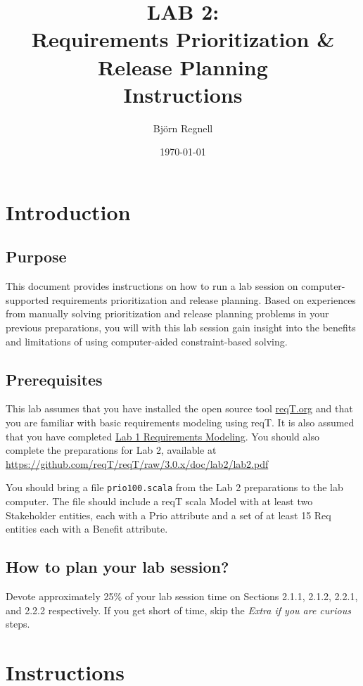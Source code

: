 \documentclass[11pt]{article}
\title{{\bf LAB 2:\\Requirements Prioritization \& Release Planning}\\ Instructions
}
\author{Björn Regnell}
\date{\today}
\begin{document}
\maketitle

\section{Introduction}

\subsection{Purpose} This document provides instructions on how to run 
a lab session on computer-supported requirements prioritization and release planning. Based on experiences from manually solving prioritization and release planning problems in your previous preparations, you will with this lab session gain insight into the benefits and limitations of using computer-aided constraint-based solving. 

\subsection{Prerequisites} This lab assumes that you have installed the open source tool \href{http://reqT.org}{reqT.org} and that you are familiar with basic requirements modeling using reqT. It is also assumed that you have completed \href{https://github.com/reqT/reqT/raw/3.0.x/doc/lab1/lab1.pdf}{Lab 1 Requirements Modeling}. You should also complete the preparations for Lab 2, available at \url{https://github.com/reqT/reqT/raw/3.0.x/doc/lab2/lab2.pdf} 

You should bring a file \verb+prio100.scala+ from the Lab 2 preparations to the lab computer. The file should include a reqT scala Model with at least two Stakeholder entities, each with a Prio attribute and a set of at least 15 Req entities each with a Benefit attribute.   

\subsection{How to plan your lab session?}
Devote approximately 25\% of your lab session time on Sections 2.1.1, 2.1.2, 2.2.1, and 2.2.2 respectively. If you get short of time, skip the {\it Extra if you are curious} steps.

\clearpage\newpage
\section{Instructions}\label{section:instr}
\end{document}
